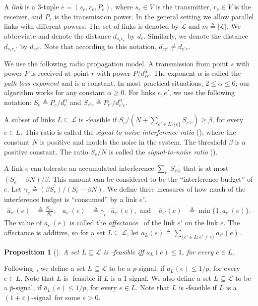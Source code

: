 \documentclass[11pt]{article}
\newenvironment{proof sketch}{\noindent {\bf Proof sketch:} }{\hfill \qed}
\newtheorem{proposition}{Proposition}
\newcommand{\eps}{\varepsilon}
\newcommand{\sinr}{\text{\sc{sinr}}}
\newcommand{\snr}{\text{\sc{snr}}}
\newcommand{\LL}{\mathcal{L}}
\newcommand{\eqdf}{\triangleq}
\newcommand{\barsignal}{$\text{signal}$}
\begin{document}
A \emph{link} is a $3$-tuple $e=(s_e,r_e,P_e)$, where $s_e\in V$ is the
transmitter, $r_e\in V$ is the receiver, and $P_e$ is the transmission power.
In the general setting we allow parallel links with different powers.
The set of links is denoted by $\LL$ and $m \eqdf |\LL|$.
We abbreviate and denote the distance $d_{s_er_e}$ by $d_e$.
Similarly, we denote the distance $d_{s_er_e'}$ by $d_{ee'}$.
Note that according to this notation, $d_{ee'}\neq d_{e'e}$.

We use the following radio propagation model.  A transmission from
point $s$ with power $P$ is received at point $r$ with power
$P/d_{sr}^{\alpha}$.  The exponent $\alpha$ is called the \emph{path
  loss exponent} and is a constant.
  In most practical
situations, $2 \leq \alpha \leq 6$; our algorithm works for any constant $\alpha \geq 0$.
For links $e,e'$, we use the
following notation: $S_e\eqdf P_e/d_e^\alpha$ and
$S_{e'e} \eqdf P_{e'}/{d_{e'e}^{\alpha}}$.

A subset of links $L\subseteq \LL$ is \sinr-feasible if
$S_e/(N+\sum_{e'\in L \setminus\{e\}} S_{e'e}) \geq \beta$, for every $e\in L$.
This ratio is called the \emph{signal-to-noise-interference ratio}
(\sinr), where the constant $N$ is positive and models the noise in
the system.  The threshold $\beta$ is a positive constant. The ratio
$S_e/N$ is called the \emph{signal-to-noise ratio} (\snr).

A link $e$ can tolerate an accumulated interference $\sum_{e'} S_{e'e}$ that is at most
$(S_e-\beta N)/\beta$.  This amount can be considered to be the
``interference budget'' of $e$.  Let $\gamma_e \eqdf (\beta S_e)/(S_e-\beta N)$.
We define three measures of how much of the interference budget is ``consumed'' by a link $e'$.
\begin{align*}
  \hat a_{e'}(e)&\eqdf \frac{S_{e'e}}{S_e},
&
  a_{e'}(e)&\eqdf \gamma_e \cdot   \hat a_{e'}(e), \text{ and }
&
  \bar a_{e'}(e)&\eqdf \min\{1,a_{e'}(e)\}.
\end{align*}
The value of $a_{e'}(e)$ is called the \emph{affectance}~\cite{HW} of the link
$e'$ on the link $e$. The affectance is additive, so
for a set $L\subseteq\LL$, let $a_L(e) \eqdf \sum_{\{e'\in L : e'\neq e\}} a_{e'}(e)$.
\begin{proposition}[\cite{HW}]
  A set $L\subseteq \LL$ is \sinr-feasible iff $a_L(e) \leq 1$, for every $e\in L$.
\end{proposition}

Following~\cite{HW}, we define a set $L\subseteq \LL$ to be a
$p$-signal, if $a_L(e) \leq 1/p$, for every $e\in L$. Note that $L$ is
\sinr-feasible if $L$ is a $1$-signal.
We also define a set $L\subseteq \LL$ to be a
$\bar p$-\barsignal, if ${\bar a}_L(e) \leq 1/p$, for every $e\in L$. Note that $L$ is
\sinr-feasible if $L$ is a $\overline{(1+\eps)}$-\barsignal\ for some $\eps > 0$.
\end{document}
